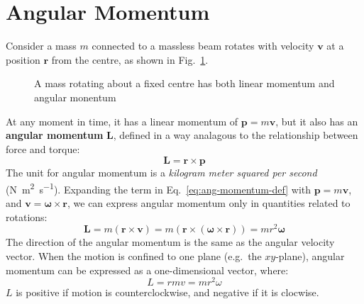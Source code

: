 \section{Angular Momentum}
Consider a mass $m$ connected to a massless beam rotates with velocity
$\bm v$ at a position $\bm r$ from the centre, as shown in
Fig.~\ref{fig:mass-on-stick}.
\begin{figure}[ht]
  \centering
  \caption{A mass rotating about a fixed centre has both linear momentum and
    angular monentum}
  \label{fig:mass-on-stick}
\end{figure}
At any moment in time, it has a linear momentum of $\bm p=m\bm v$, but it also
has an \textbf{angular momentum} $\bm L$, defined in a way analagous to the
relationship between force and torque:
\begin{equation}
  \bm L=\bm r\times\bm p
  \label{eq:ang-momentum-def}
\end{equation}
The unit for angular momentum is a \emph{kilogram meter squared per second}
(\si{\newton\metre\squared\per\second}). Expanding the term in
Eq.~\ref{eq:ang-momentum-def} with $\bm p=m\bm v$, and
$\bm v=\bm\omega\times\bm r$, we can express angular momentum only in
quantities related to rotations:
\begin{equation}
  \bm L
  =m(\bm r\times\bm v)
  =m(\bm r\times(\bm\omega\times\bm r)) = mr^2\bm\omega
  \label{eq:l-vector}
\end{equation}
The direction of the angular momentum is the same as the angular velocity
vector. When the motion is confined to one plane (e.g.\ the $xy$-plane),
angular momentum can be expressed as a one-dimensional vector, where:
\begin{equation}
  L=rmv=mr^2\omega
  \label{eq:l-scalar}
\end{equation}
$L$ is positive if motion is counterclockwise, and negative if it is clocwise.

